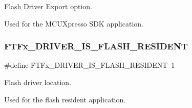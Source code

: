 Flash Driver Export option. 

Used for the M\+C\+U\+Xpresso S\+DK application. \mbox{\label{group__ftfx__feature_ga0989b400fb1c51918760be1e367bcbc1}} 
\subsubsection{\texorpdfstring{FTFx\_DRIVER\_IS\_FLASH\_RESIDENT}{FTFx\_DRIVER\_IS\_FLASH\_RESIDENT}}
{\footnotesize\ttfamily \#define F\+T\+Fx\+\_\+\+D\+R\+I\+V\+E\+R\+\_\+\+I\+S\+\_\+\+F\+L\+A\+S\+H\+\_\+\+R\+E\+S\+I\+D\+E\+NT~1}



Flash driver location. 

Used for the flash resident application. 